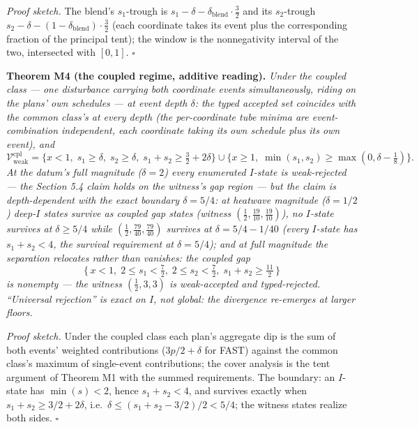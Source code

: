 \documentclass[3p,11pt]{elsarticle}
\begin{document}
\emph{Proof sketch.} The blend's \(s_1\)-trough is \(s_1 - \delta -
\delta_{\mathrm{blend}} \cdot \tfrac32\) and its \(s_2\)-trough
\(s_2 - \delta - (1 - \delta_{\mathrm{blend}}) \cdot \tfrac32\)
(each coordinate takes its event plus the corresponding fraction of the
principal tent); the window is the nonnegativity interval of the two,
intersected with \([0,1]\). \ensuremath{\square}

\textbf{Theorem M4 (the coupled regime, additive reading).} \emph{Under
the coupled class --- one disturbance carrying both coordinate events
simultaneously, riding on the plans' own schedules --- at event depth
\(\delta\): the typed accepted set coincides with the common class's
at every depth (the per-coordinate tube minima are event-combination
independent, each coordinate taking its own schedule plus its own
event), and}
\[
\mathcal{V}_{\mathrm{weak}}^{\mathrm{cpl}}
= \{ x < 1,\; s_1 \ge \delta,\; s_2 \ge \delta,\; s_1 + s_2 \ge \tfrac32
+ 2\delta \}
\cup \{ x \ge 1,\; \min(s_1, s_2) \ge \max(0, \delta - \tfrac18) \}.
\]
\emph{At the datum's full magnitude (\(\delta = 2\)) every enumerated
\(I\)-state is weak-rejected --- the Section 5.4 claim holds on the
witness's gap region --- but the claim is depth-dependent with the exact
boundary \(\delta = 5/4\): at heatwave magnitude (\(\delta =
1/2\)) deep-\(I\) states survive as coupled gap states (witness
\((\tfrac12, \tfrac{19}{10}, \tfrac{19}{10})\)), no \(I\)-state
survives at \(\delta \ge 5/4\) while \((\tfrac12, \tfrac{79}{40},
\tfrac{79}{40})\) survives at \(\delta = 5/4 - 1/40\) (every
\(I\)-state has \(s_1 + s_2 < 4\), the survival requirement at
\(\delta = 5/4\)); and at full magnitude the separation relocates
rather than vanishes: the coupled gap}
\[
\{\, x < 1,\; 2 \le s_1 < \tfrac72,\; 2 \le s_2 < \tfrac72,\; s_1 + s_2
\ge \tfrac{11}{2} \,\}
\]
\emph{is nonempty --- the witness \((\tfrac12, 3, 3)\) is
weak-accepted and typed-rejected. ``Universal rejection'' is exact on
\(I\), not global: the divergence re-emerges at larger floors.}

\emph{Proof sketch.} Under the coupled class each plan's aggregate dip
is the sum of both events' weighted contributions (\(3p/2 + \delta\)
for FAST) against the common class's maximum of single-event
contributions; the cover analysis is the tent argument of Theorem M1
with the summed requirements. The boundary: an \(I\)-state has
\(\min(s) < 2\), hence \(s_1 + s_2 < 4\), and survives exactly
when \(s_1 + s_2 \ge 3/2 + 2\delta\), i.e.\ \(\delta \le (s_1 +
s_2 - 3/2)/2 < 5/4\); the witness states realize both sides.
\ensuremath{\square}
\end{document}
